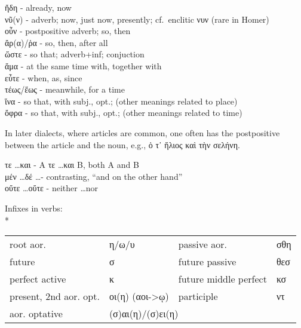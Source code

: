 \begin{small}

ἤδη - already, now\\
νῦ(ν) - adverb; now, just now, presently; cf.~enclitic νυν (rare in Homer)\\
οὖν - postpositive adverb; so, then\\
ἄρ(α)/ῥα - so, then, after all\\
ὥστε - so that; adverb+inf; conjuction\\
ἅμα - at the same time with, together with\\
εὖτε - when, as, since\\
τέως/ἕως - meanwhile, for a time\\
ἵνα - so that, with subj., opt.; (other meanings related to place)\\
ὄφρα - so that, with subj., opt.; (other meanings related to time)


In later dialects, where articles are common, one often has
the postpositive between the article and the noun, e.g.,
ὁ τ᾽ ἥλιος καὶ τὴν σελήνη.

τε \ldots και - A τε \ldots και Β, both A and B\\
μέν \ldots δέ \ldots - contrasting, ``and on the other hand''\\
οὔτε \ldots οὔτε - neither \ldots nor\\

\vfill

\pagebreak


\newcommand{\tca}{\cellcolor{TableColorA}}
\newcommand{\tcb}{\cellcolor{TableColorB}}

Infixes in verbs:\\*
%
\begin{tabular}{llll}
root aor.         & η/ω/υ & passive aor.      & σθη \\
future              & σ     & future passive      & θεσ \\
perfect active      & κ     & future middle perfect & κσ \\
present, 2nd aor. opt.    & οι(η) (αοι->ῳ) & participle        & ντ\footnotemark \\
aor. optative     & \multicolumn{3}{l}{(σ)αι(η)/(σ)ει(η)}\\
\end{tabular}


\end{small}
